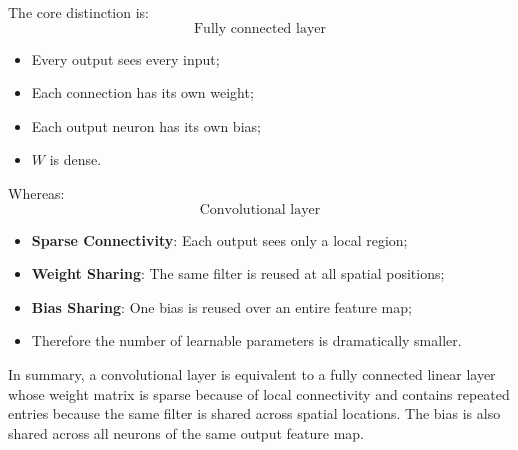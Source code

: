 \highspace
\begin{takeawaysbox}
    The core distinction is:
    \begin{equation*}
        \text{Fully connected layer}
    \end{equation*}
    \begin{itemize}
        \item Every output sees every input;
        \item Each connection has its own weight;
        \item Each output neuron has its own bias;
        \item $W$ is dense.
    \end{itemize}
    Whereas:
    \begin{equation*}
        \text{Convolutional layer}
    \end{equation*}
    \begin{itemize}
        \item \textbf{Sparse Connectivity}: Each output sees only a local region;
        \item \textbf{Weight Sharing}: The same filter is reused at all spatial positions;
        \item \textbf{Bias Sharing}: One bias is reused over an entire feature map;
        \item Therefore the number of learnable parameters is dramatically smaller.
    \end{itemize}
    In summary, a convolutional layer is equivalent to a fully connected linear layer whose weight matrix is sparse because of local connectivity and contains repeated entries because the same filter is shared across spatial locations. The bias is also shared across all neurons of the same output feature map.
\end{takeawaysbox}